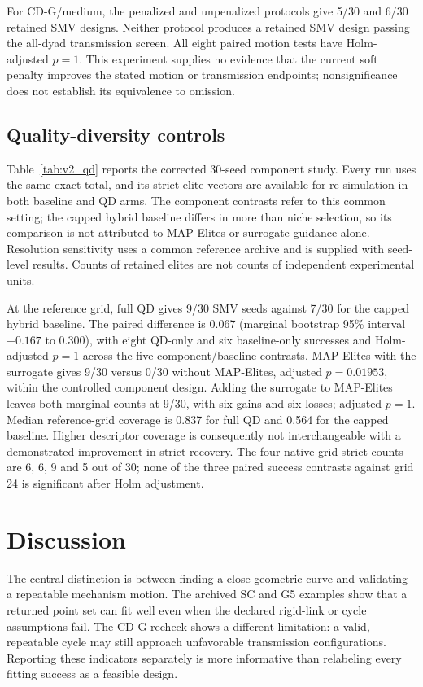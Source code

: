 \documentclass[applsci,article,submit,pdftex,moreauthors]{Definitions/mdpi}
\begin{document}

For CD-G/medium, the penalized and unpenalized protocols give 5/30 and 6/30 retained SMV designs. Neither protocol produces a retained SMV design passing the all-dyad transmission screen. All eight paired motion tests have Holm-adjusted $p=1$. This experiment supplies no evidence that the current soft penalty improves the stated motion or transmission endpoints; nonsignificance does not establish its equivalence to omission.

\subsection{Quality-diversity controls}\label{sec:qd_results}
Table~\ref{tab:v2_qd} reports the corrected 30-seed component study. Every run uses the same exact total, and its strict-elite vectors are available for re-simulation in both baseline and QD arms. The component contrasts refer to this common setting; the capped hybrid baseline differs in more than niche selection, so its comparison is not attributed to MAP-Elites or surrogate guidance alone. Resolution sensitivity uses a common reference archive and is supplied with seed-level results. Counts of retained elites are not counts of independent experimental units.



At the reference grid, full QD gives 9/30 SMV seeds against 7/30 for the capped hybrid baseline. The paired difference is 0.067 (marginal bootstrap 95\% interval $-0.167$ to 0.300), with eight QD-only and six baseline-only successes and Holm-adjusted $p=1$ across the five component/baseline contrasts. MAP-Elites with the surrogate gives 9/30 versus 0/30 without MAP-Elites, adjusted $p=0.01953$, within the controlled component design. Adding the surrogate to MAP-Elites leaves both marginal counts at 9/30, with six gains and six losses; adjusted $p=1$. Median reference-grid coverage is 0.837 for full QD and 0.564 for the capped baseline. Higher descriptor coverage is consequently not interchangeable with a demonstrated improvement in strict recovery. The four native-grid strict counts are 6, 6, 9 and 5 out of 30; none of the three paired success contrasts against grid 24 is significant after Holm adjustment.

\section{Discussion}
The central distinction is between finding a close geometric curve and validating a repeatable mechanism motion. The archived SC and G5 examples show that a returned point set can fit well even when the declared rigid-link or cycle assumptions fail. The CD-G recheck shows a different limitation: a valid, repeatable cycle may still approach unfavorable transmission configurations. Reporting these indicators separately is more informative than relabeling every fitting success as a feasible design.
\end{document}
